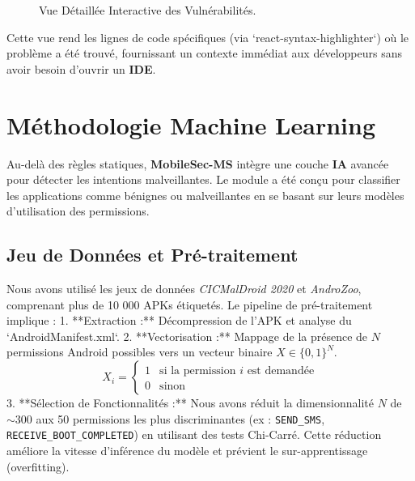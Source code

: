 \documentclass[
  journal=largetwo,
  manuscript=article-type,
  year=2025,
  volume=1,
]{cup-journal}
\begin{document}
\begin{figure}
\centering
{}
\caption{Vue Détaillée Interactive des Vulnérabilités.}
\label{fig-vuln-drawer}
\end{figure}

Cette vue rend les lignes de code spécifiques (via `react-syntax-highlighter`) où le problème a été trouvé, fournissant un contexte immédiat aux développeurs sans avoir besoin d'ouvrir un \textbf{IDE}.

\section{Méthodologie Machine Learning}
\label{sec-ml}

Au-delà des règles statiques, \textbf{MobileSec-MS} intègre une couche \textbf{IA} avancée pour détecter les intentions malveillantes. Le module a été conçu pour classifier les applications comme bénignes ou malveillantes en se basant sur leurs modèles d'utilisation des permissions.

\subsection{Jeu de Données et Pré-traitement}
Nous avons utilisé les jeux de données \textit{CICMalDroid 2020} et \textit{AndroZoo}, comprenant plus de 10 000 APKs étiquetés. Le pipeline de pré-traitement implique :
1.  **Extraction :** Décompression de l'APK et analyse du `AndroidManifest.xml`.
2.  **Vectorisation :** Mappage de la présence de $N$ permissions Android possibles vers un vecteur binaire $X \in \{0, 1\}^N$.
    \[
    X_i = \begin{cases} 
    1 & \text{si la permission } i \text{ est demandée} \\
    0 & \text{sinon}
    \end{cases}
    \]
3.  **Sélection de Fonctionnalités :** Nous avons réduit la dimensionnalité $N$ de $\sim$300 aux 50 permissions les plus discriminantes (ex : \texttt{SEND\_SMS}, \texttt{RECEIVE\_BOOT\_COMPLETED}) en utilisant des tests Chi-Carré. Cette réduction améliore la vitesse d'inférence du modèle et prévient le sur-apprentissage (overfitting).
\end{document}
